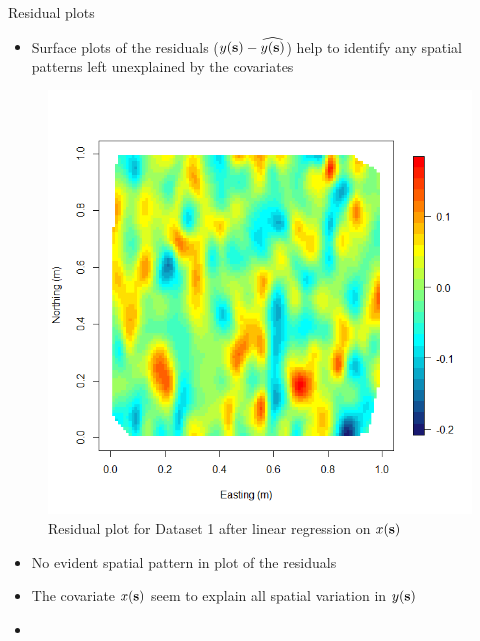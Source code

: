 \begin{frame}{Residual plots}
	\begin{itemize}
		\item Surface plots of the residuals ($y(\textbf{s}) - \widehat{y(\textbf{s})}$) help to identify any spatial patterns left unexplained by the covariates 
	\end{itemize}
	\begin{figure}
		\includegraphics[scale=0.15,trim={2mm 5mm 2mm  5mm},clip]{../figures/data1_res.png}
		\caption{Residual plot for Dataset 1 after linear regression on $x(\textbf{s})$}
	\end{figure}
	\pause
	\vskip -5mm \begin{itemize}
		\item No evident spatial pattern in plot of the residuals
		\item The covariate $x(\textbf{s})$ seem to explain all spatial variation in $y(\textbf{s})$
		\item {}
	\end{itemize}
\end{frame}

